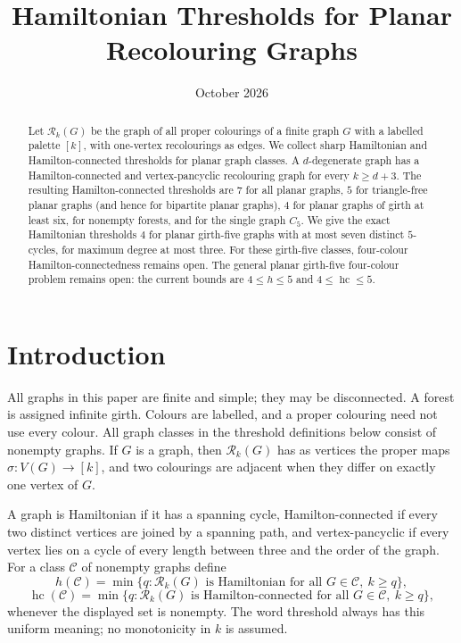 \documentclass[11pt]{article}
\title{Hamiltonian Thresholds for Planar Recolouring Graphs}
\author{}
\date{October 2026}
\theoremstyle{remark}
\newcommand{\Rk}{\mathcal R_k}
\newcommand{\hc}{\operatorname{hc}}
\numberwithin{equation}{section}
\numberwithin{table}{section}
\begin{document}
\maketitle

\begin{abstract}
Let $\Rk(G)$ be the graph of all proper colourings of a finite graph $G$ with a labelled palette $[k]$, with one-vertex recolourings as edges.  We collect sharp Hamiltonian and Hamilton-connected thresholds for planar graph classes.  A $d$-degenerate graph has a Hamilton-connected and vertex-pancyclic recolouring graph for every $k\ge d+3$.  The resulting Hamilton-connected thresholds are $7$ for all planar graphs, $5$ for triangle-free planar graphs (and hence for bipartite planar graphs), $4$ for planar graphs of girth at least six, for nonempty forests, and for the single graph $C_5$.  We give the exact Hamiltonian thresholds $4$ for planar girth-five graphs with at most seven distinct $5$-cycles, for maximum degree at most three.  For these girth-five classes, four-colour Hamilton-connectedness remains open.  The general planar girth-five four-colour problem remains open: the current bounds are $4\le h\le5$ and $4\le\hc\le5$.
\end{abstract}

\section{Introduction}

All graphs in this paper are finite and simple; they may be disconnected.  A forest is assigned infinite girth.  Colours are labelled, and a proper colouring need not use every colour. All graph classes in the threshold definitions below consist of nonempty graphs.  If $G$ is a graph, then $\Rk(G)$ has as vertices the proper maps $\sigma:V(G)\to[k]$, and two colourings are adjacent when they differ on exactly one vertex of $G$.

A graph is Hamiltonian if it has a spanning cycle, Hamilton-connected if every two distinct vertices are joined by a spanning path, and vertex-pancyclic if every vertex lies on a cycle of every length between three and the order of the graph.  For a class $\mathcal C$ of nonempty graphs define
\[
 h(\mathcal C)=\min\{q: \Rk(G)\text{ is Hamiltonian for all }G\in\mathcal C,\ k\ge q\},
\]
\[
 \hc(\mathcal C)=\min\{q: \Rk(G)\text{ is Hamilton-connected for all }G\in\mathcal C,\ k\ge q\},
\]
whenever the displayed set is nonempty.  The word threshold always has this uniform meaning; no monotonicity in $k$ is assumed.
\end{document}
